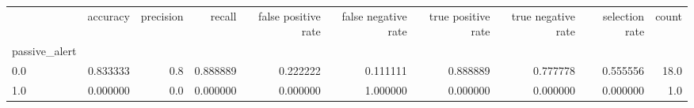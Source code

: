 \begin{tabular}{lrrrrrrrrr}
\toprule
{} &  accuracy &  precision &    recall &  false positive rate &  false negative rate &  true positive rate &  true negative rate &  selection rate &  count \\
passive\_alert &           &            &           &                      &                      &                     &                     &                 &        \\
\midrule
0.0           &  0.833333 &        0.8 &  0.888889 &             0.222222 &             0.111111 &            0.888889 &            0.777778 &        0.555556 &   18.0 \\
1.0           &  0.000000 &        0.0 &  0.000000 &             0.000000 &             1.000000 &            0.000000 &            0.000000 &        0.000000 &    1.0 \\
\bottomrule
\end{tabular}
